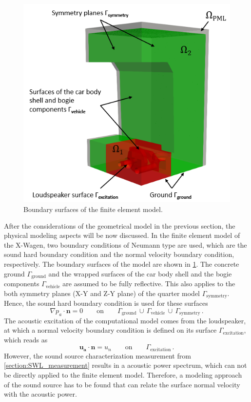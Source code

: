 \begin{figure}
	\centering
	\includegraphics{fig/chap4/region_labels.png}
	\caption{Boundary surfaces of the finite element model.}
	\label{fig:boundary_conditions}
\end{figure}

After the considerations of the geometrical model in the previous section, the physical modeling aspects will be now discussed. In the finite element model of the X-Wagen, two boundary conditions of Neumann type are used, which are the sound hard boundary condition and the normal velocity boundary condition, respectively. The boundary surfaces of the model are shown in \cref{fig:boundary_conditions}. The concrete ground $\Gamma_{\text{ground}}$ and the wrapped surfaces of the car body shell and the bogie components $\Gamma_{\text{vehicle}}$ are assumed to be fully reflective. This also applies to the both symmetry planes (X-Y and Z-Y plane) of the quarter model $\Gamma_{\text{symmetry}}$. Hence, the sound hard boundary condition is used for these surfaces
\begin{equation}
	\nabla p_a \cdot \boldsymbol{n} = 0\qquad\text{on}\qquad\Gamma_{\text{ground}}\,\cup\,\Gamma_{\text{vehicle}}\,\cup\,\Gamma_{\text{symmetry}}\,.
\end{equation}
The acoustic excitation of the computational model comes from the loudspeaker, at which a normal velocity boundary condition is defined on its surface $\Gamma_{\text{excitation}}$, which reads as
\begin{equation}
	\boldsymbol{u_a} \cdot \boldsymbol{n} = u_{n}\qquad\text{on}\qquad\Gamma_{\text{excitation}}\,.
\end{equation}
However, the sound source characterization measurement from \cref{section:SWL_measurement} results in a acoustic power spectrum, which can not be directly applied to the finite element model. Therefore, a modeling approach of the sound source has to be found that can relate the surface normal velocity with the acoustic power.

